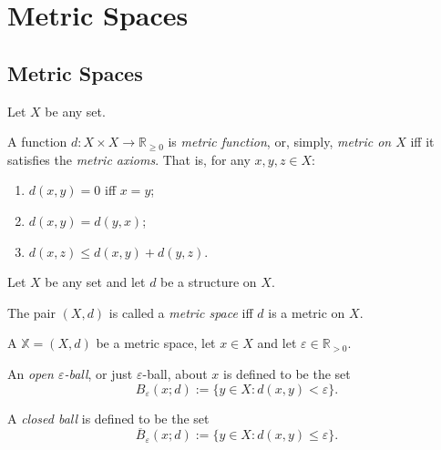 \tableofcontents


\chapter{Metric Spaces}


\section{Metric Spaces}


\begin{definition}
	\label{def: metric axioms}
	Let $X$ be any set.
	
	A function $d: X \times X \to \mathbb R_{\ge 0}$ is \textit{metric function}, or, simply, \textit{metric on $X$} iff it satisfies the \textit{metric axioms}. That is, for any $x, y, z \in X$:
	\begin{enumerate}[\bf M1. ]
		\item $d(x,y) = 0$ iff $x = y$;
		\item $d(x,y) = d(y,x)$;
		\item $d(x, z) \le d(x,y) + d(y,z)$.
	\end{enumerate}
\end{definition}


\begin{definition}
	\label{def: metric space}
	Let $X$ be any set and let $d$ be a structure on $X$.
	
	The pair $(X, d)$ is called a \textit{metric space} iff $d$ is a metric on $X$.
\end{definition}


\begin{definition}
	\label{def: ball}
	A $\mathbb X = (X, d)$ be a metric space, let $x \in X$ and let $\varepsilon \in \mathbb R_{> 0}$.
	
	An \textit{open $\varepsilon$-ball}, or just $\varepsilon$-ball, about $x$ is defined to be the set
	$$
	B_\varepsilon (x; d) := \{ y \in X : d(x,y) < \varepsilon \}.
	$$
	
	A \textit{closed ball} is defined to be the set
	$$
	\overline{B}_\varepsilon (x; d) := \{ y \in X : d(x,y) \le \varepsilon \}.
	$$
\end{definition}


